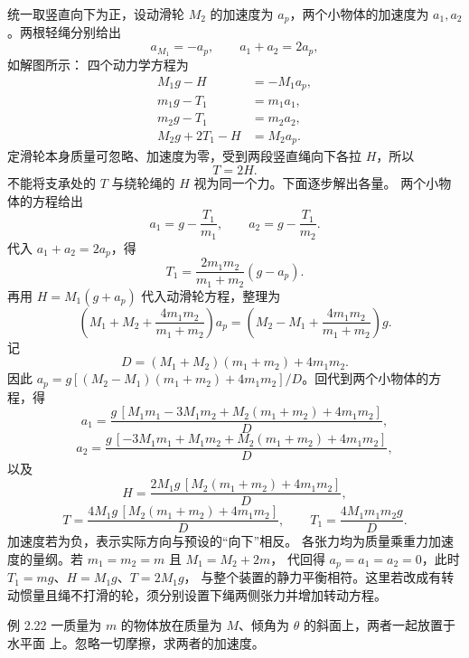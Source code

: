 \begin{xesolution}
统一取竖直向下为正，设动滑轮 $M_2$ 的加速度为 $a_p$，两个小物体的加速度为
$a_1,a_2$。两根轻绳分别给出
\[
 a_{M_1}=-a_p,
 \qquad
 a_1+a_2=2a_p,
\]
如解图所示：
\soldiagTwoTwentyOne
四个动力学方程为
\begin{align*}
 M_1g-H&=-M_1a_p,\\
 m_1g-T_1&=m_1a_1,\\
 m_2g-T_1&=m_2a_2,\\
 M_2g+2T_1-H&=M_2a_p.
\end{align*}
定滑轮本身质量可忽略、加速度为零，受到两段竖直绳向下各拉 $H$，所以
\[
 \boxed{T=2H}.
\]
不能将支承处的 $T$ 与绕轮绳的 $H$ 视为同一个力。下面逐步解出各量。
两个小物体的方程给出
\[
 a_1=g-\frac{T_1}{m_1},\qquad a_2=g-\frac{T_1}{m_2}.
\]
代入 $a_1+a_2=2a_p$，得
\[
 T_1=\frac{2m_1m_2}{m_1+m_2}(g-a_p).
\]
再用 $H=M_1(g+a_p)$ 代入动滑轮方程，整理为
\[
 \left(M_1+M_2+\frac{4m_1m_2}{m_1+m_2}\right)a_p
 =\left(M_2-M_1+\frac{4m_1m_2}{m_1+m_2}\right)g.
\]
记
\[
 D=(M_1+M_2)(m_1+m_2)+4m_1m_2.
\]
因此 $a_p=g[(M_2-M_1)(m_1+m_2)+4m_1m_2]/D$。回代到两个小物体的方程，得
\[
 \boxed{a_1=
 \frac{g\,[M_1m_1-3M_1m_2+M_2(m_1+m_2)+4m_1m_2]}{D}},
\]
\[
 \boxed{a_2=
 \frac{g\,[-3M_1m_1+M_1m_2+M_2(m_1+m_2)+4m_1m_2]}{D}},
\]
以及
\[
 \boxed{H=\frac{2M_1g\,[M_2(m_1+m_2)+4m_1m_2]}{D}},
\]
\[
 \boxed{T=\frac{4M_1g\,[M_2(m_1+m_2)+4m_1m_2]}{D}},\qquad
 \boxed{T_1=\frac{4M_1m_1m_2g}{D}}.
\]
加速度若为负，表示实际方向与预设的“向下”相反。
各张力均为质量乘重力加速度的量纲。若 $m_1=m_2=m$ 且 $M_1=M_2+2m$，
代回得 $a_p=a_1=a_2=0$，此时 $T_1=mg$、$H=M_1g$、$T=2M_1g$，
与整个装置的静力平衡相符。这里若改成有转动惯量且绳不打滑的轮，须分别设置下绳两侧张力并增加转动方程。
\end{xesolution}

\begin{origexamplebox}{例 2.22}
一质量为 $m$ 的物体放在质量为 $M$、倾角为 $\theta$ 的斜面上，两者一起放置于水平面
上。忽略一切摩擦，求两者的加速度。
\probdiagTwoTwentyTwo
\end{origexamplebox}

